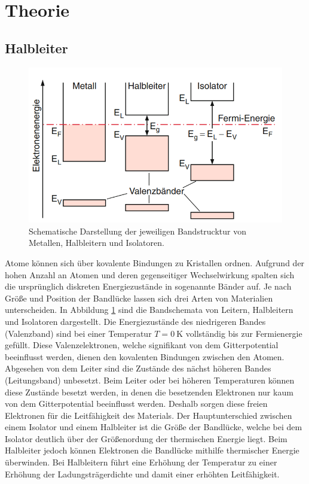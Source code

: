 \section{Theorie}
\label{sec:Theorie}


\subsection{Halbleiter}

\begin{figure}
    \centering
    \includegraphics[width=.9\textwidth]{Bilder/Metall_Iso_Halb.PNG}
    \caption{Schematische Darstellung der jeweiligen Bandstrucktur von Metallen, Halbleitern und Isolatoren. \cite[S. 446]{Dem3}}
    \label{fig:band}
\end{figure}


Atome können sich über kovalente Bindungen zu Kristallen ordnen.
Aufgrund der hohen Anzahl an Atomen und deren gegenseitiger Wechselwirkung spalten sich die ursprünglich diskreten Energiezustände in sogenannte Bänder auf.
Je nach Größe und Position der Bandlücke lassen sich drei Arten von Materialien unterscheiden.
In Abbildung \ref{fig:band} sind die Bandschemata von Leitern, Halbleitern und Isolatoren dargestellt.
Die Energiezustände des niedrigeren Bandes (Valenzband) sind bei einer Temperatur $T=\SI{0}{\kelvin}$ vollständig bis zur Fermienergie gefüllt.
Diese Valenzelektronen, welche signifikant von dem Gitterpotential beeinflusst werden, dienen den kovalenten Bindungen zwischen den Atomen. 
Abgesehen von dem Leiter sind die Zustände des nächst höheren Bandes (Leitungsband) unbesetzt. 
Beim Leiter oder bei höheren Temperaturen können diese Zustände besetzt werden, in denen die besetzenden Elektronen nur kaum von dem Gitterpotential beeinflusst werden.
Deshalb sorgen diese freien Elektronen für die Leitfähigkeit des Materials. 
Der Hauptunterschied zwischen einem Isolator und einem Halbleiter ist die Größe der Bandlücke, welche bei dem Isolator deutlich über der Größenordung der thermischen Energie liegt.
Beim Halbleiter jedoch können Elektronen die Bandlücke mithilfe thermischer Energie überwinden.
Bei Halbleitern führt eine Erhöhung der Temperatur zu einer Erhöhung der Ladungsträgerdichte und damit einer erhöhten Leitfähigkeit.



